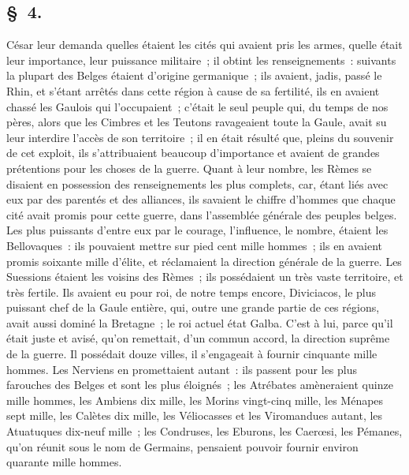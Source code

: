 \documentclass[french,twoside]{book} %
\begin{document}
\subsection[{§ 4.}]{ \textsc{§ 4.} }
\noindent César leur demanda quelles étaient les cités qui avaient pris les armes, quelle était leur importance, leur puissance militaire ; il obtint les renseignements : suivants la plupart des Belges étaient d’origine germanique ; ils avaient, jadis, passé le Rhin, et s’étant arrêtés dans cette région à cause de sa fertilité, ils en avaient chassé les Gaulois qui l’occupaient ; c’était le seul peuple qui, du temps de nos pères, alors que les Cimbres et les Teutons ravageaient toute la Gaule, avait su leur interdire l’accès de son territoire ; il en était résulté que, pleins du souvenir de cet exploit, ils s’attribuaient beaucoup d’importance et avaient de grandes prétentions pour les choses de la guerre. Quant à leur nombre, les Rèmes se disaient en possession des renseignements les plus complets, car, étant liés avec eux par des parentés et des alliances, ils savaient le chiffre d’hommes que chaque cité avait promis pour cette guerre, dans l’assemblée générale des peuples belges. Les plus puissants d’entre eux par le courage, l’influence, le nombre, étaient les Bellovaques : ils pouvaient mettre sur pied cent mille hommes ; ils en avaient promis soixante mille d’élite, et réclamaient la direction générale de la guerre. Les Suessions étaient les voisins des Rèmes ; ils possédaient un très vaste territoire, et très fertile. Ils avaient eu pour roi, de notre temps encore, Diviciacos, le plus puissant chef de la Gaule entière, qui, outre une grande partie de ces régions, avait aussi dominé la Bretagne ; le roi actuel état Galba. C'est à lui, parce qu’il était juste et avisé, qu’on remettait, d’un commun accord, la direction suprême de la guerre. Il possédait douze villes, il s’engageait à fournir cinquante mille hommes. Les Nerviens en promettaient autant : ils passent pour les plus farouches des Belges et sont les plus éloignés ; les Atrébates amèneraient quinze mille hommes, les Ambiens dix mille, les Morins vingt-cinq mille, les Ménapes sept mille, les Calètes dix mille, les Véliocasses et les Viromandues autant, les Atuatuques dix-neuf mille ; les Condruses, les Eburons, les Caerœsi, les Pémanes, qu’on réunit sous le nom de Germains, pensaient pouvoir fournir environ quarante mille hommes.
\end{document}
